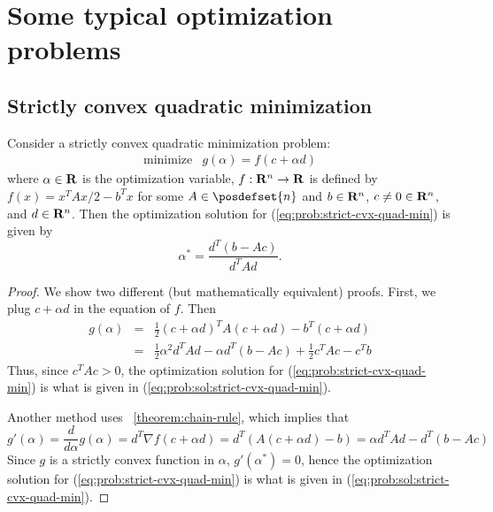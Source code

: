 
\section{Some typical optimization problems}

\subsection{Strictly convex quadratic minimization}

Consider a strictly convex quadratic minimization problem:
\begin{equation}
\label{eq:prob:strict-cvx-quad-min}
\begin{array}{ll}
\mbox{minimize} & g(\alpha) = f(c+\alpha d)
\end{array}
\end{equation}
where $\alpha\in\mathbf{R}$ is the optimization variable,
$f:\mathbf{R}^n \to \mathbf{R}$ is defined by
$f(x) = x^T A x/2 - b^Tx$
for some
$A\in\posdefset{n}$
and
$b\in\mathbf{R}^n$,
$c\neq 0\in\mathbf{R}^n$,
and $d\in\mathbf{R}^n$.
Then the optimization solution for (\ref{eq:prob:strict-cvx-quad-min}) is given by
\begin{equation}
\label{eq:prob:sol:strict-cvx-quad-min}
\alpha^\ast = \frac{d^T ( b - Ac)}{d^T A d}.
\end{equation}

\begin{proof}
We show two different (but mathematically equivalent) proofs.
First, we plug $c + \alpha d$ in the equation of $f$. Then
\begin{eqnarray*}
g(\alpha) &=& \frac{1}{2} (c+\alpha d)^T A (c+ \alpha d) - b^T (c + \alpha d)
\\
&=& \frac{1}{2} \alpha^2 d^T A d - \alpha d^T ( b - Ac)
+ \frac{1}{2} c^TAc - c^Tb
\end{eqnarray*}
Thus, since $c^TAc>0$,
the optimization solution for (\ref{eq:prob:strict-cvx-quad-min}) is what is given in (\ref{eq:prob:sol:strict-cvx-quad-min}).

Another method uses \theoremname~\ref{theorem:chain-rule},
which implies that
\begin{equation}
g'(\alpha)
= \frac{d}{d\alpha} g(\alpha)
= d^T \nabla f(c+\alpha d)
= d^T ( A(c+\alpha d) - b )
= \alpha d^T A d - d^T( b - Ac)
\end{equation}
Since $g$ is a strictly convex function in $\alpha$,
$g'(\alpha^\ast) = 0$,
hence
the optimization solution for (\ref{eq:prob:strict-cvx-quad-min}) is what is given in (\ref{eq:prob:sol:strict-cvx-quad-min}).

\end{proof}
